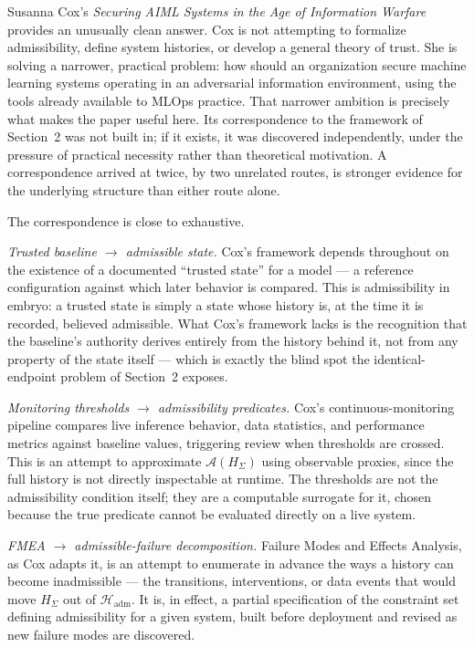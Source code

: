 \documentclass[11pt]{article}
\begin{document}
Susanna Cox's \emph{Securing AIML Systems in the Age of Information Warfare} \cite{cox2022} provides an unusually clean answer. Cox is not attempting to formalize admissibility, define system histories, or develop a general theory of trust. She is solving a narrower, practical problem: how should an organization secure machine learning systems operating in an adversarial information environment, using the tools already available to MLOps practice. That narrower ambition is precisely what makes the paper useful here. Its correspondence to the framework of Section~2 was not built in; if it exists, it was discovered independently, under the pressure of practical necessity rather than theoretical motivation. A correspondence arrived at twice, by two unrelated routes, is stronger evidence for the underlying structure than either route alone.

The correspondence is close to exhaustive.

\emph{Trusted baseline $\to$ admissible state.} Cox's framework depends throughout on the existence of a documented ``trusted state'' for a model --- a reference configuration against which later behavior is compared. This is admissibility in embryo: a trusted state is simply a state whose history is, at the time it is recorded, believed admissible. What Cox's framework lacks is the recognition that the baseline's authority derives entirely from the history behind it, not from any property of the state itself --- which is exactly the blind spot the identical-endpoint problem of Section~2 exposes.

\emph{Monitoring thresholds $\to$ admissibility predicates.} Cox's continuous-monitoring pipeline compares live inference behavior, data statistics, and performance metrics against baseline values, triggering review when thresholds are crossed. This is an attempt to approximate $\mathcal{A}(H_\Sigma)$ using observable proxies, since the full history is not directly inspectable at runtime. The thresholds are not the admissibility condition itself; they are a computable surrogate for it, chosen because the true predicate cannot be evaluated directly on a live system.

\emph{FMEA $\to$ admissible-failure decomposition.} Failure Modes and Effects Analysis, as Cox adapts it, is an attempt to enumerate in advance the ways a history can become inadmissible --- the transitions, interventions, or data events that would move $H_\Sigma$ out of $\mathcal{H}_{\mathrm{adm}}$. It is, in effect, a partial specification of the constraint set defining admissibility for a given system, built before deployment and revised as new failure modes are discovered.
\end{document}
